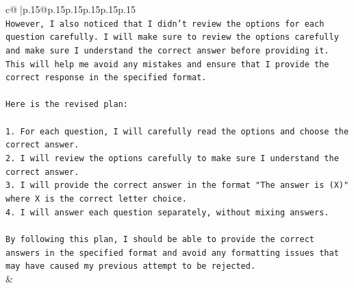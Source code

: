 \documentclass{article}
\begin{document}
{\begin{supertabular}{c@{$\;$}|p{.15\linewidth}@{}p{.15\linewidth}p{.15\linewidth}p{.15\linewidth}p{.15\linewidth}p{.15\linewidth}}
{{{\\ 
\texttt{However, I also noticed that I didn't review the options for each question carefully. I will make sure to review the options carefully and make sure I understand the correct answer before providing it. This will help me avoid any mistakes and ensure that I provide the correct response in the specified format.} \\
\\ 
\texttt{Here is the revised plan:} \\
\\ 
\texttt{1. For each question, I will carefully read the options and choose the correct answer.} \\
\texttt{2. I will review the options carefully to make sure I understand the correct answer.} \\
\texttt{3. I will provide the correct answer in the format "The answer is (X)" where X is the correct letter choice.} \\
\texttt{4. I will answer each question separately, without mixing answers.} \\
\\ 
\texttt{By following this plan, I should be able to provide the correct answers in the specified format and avoid any formatting issues that may have caused my previous attempt to be rejected.} \\
            }
        }
    }
    & \\ \\

\end{supertabular}
}
\end{document}
